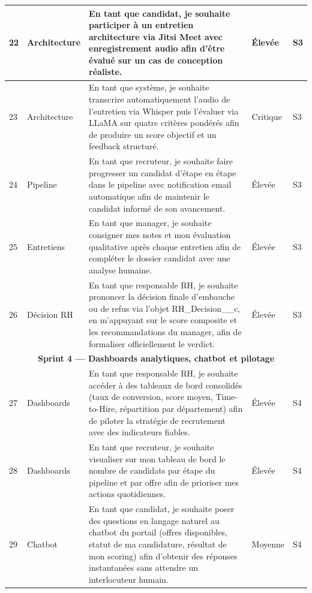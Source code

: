 \begin{longtable}{|p{0.6cm}|p{2.5cm}|p{7.5cm}|p{1.3cm}|p{1.3cm}|}
22 & Architecture & En tant que candidat, je souhaite participer à un entretien architecture via Jitsi Meet avec enregistrement audio afin d'être évalué sur un cas de conception réaliste. & Élevée & S3 \\
\hline

23 & Architecture & En tant que système, je souhaite transcrire automatiquement l'audio de l'entretien via Whisper puis l'évaluer via LLaMA sur quatre critères pondérés afin de produire un score objectif et un feedback structuré. & Critique & S3 \\
\hline

24 & Pipeline & En tant que recruteur, je souhaite faire progresser un candidat d'étape en étape dans le pipeline avec notification email automatique afin de maintenir le candidat informé de son avancement. & Élevée & S3 \\
\hline

25 & Entretiens & En tant que manager, je souhaite consigner mes notes et mon évaluation qualitative après chaque entretien afin de compléter le dossier candidat avec une analyse humaine. & Élevée & S3 \\
\hline

26 & Décision RH & En tant que responsable RH, je souhaite prononcer la décision finale d'embauche ou de refus via l'objet RH\_Decision\_\_c, en m'appuyant sur le score composite et les recommandations du manager, afin de formaliser officiellement le verdict. & Élevée & S3 \\
\hline


\multicolumn{5}{|c|}{\cellcolor{purple!10}\textbf{Sprint 4 --- Dashboards analytiques, chatbot et pilotage}} \\
\hline

27 & Dashboards & En tant que responsable RH, je souhaite accéder à des tableaux de bord consolidés (taux de conversion, score moyen, Time-to-Hire, répartition par département) afin de piloter la stratégie de recrutement avec des indicateurs fiables. & Élevée & S4 \\
\hline

28 & Dashboards & En tant que recruteur, je souhaite visualiser sur mon tableau de bord le nombre de candidats par étape du pipeline et par offre afin de prioriser mes actions quotidiennes. & Élevée & S4 \\
\hline

29 & Chatbot & En tant que candidat, je souhaite poser des questions en langage naturel au chatbot du portail (offres disponibles, statut de ma candidature, résultat de mon scoring) afin d'obtenir des réponses instantanées sans attendre un interlocuteur humain. & Moyenne & S4 \\
\hline


\end{longtable}
